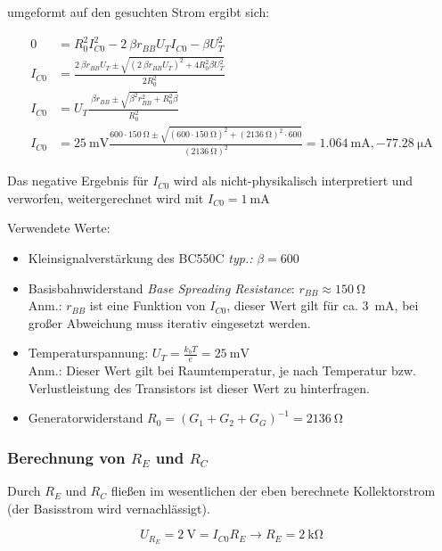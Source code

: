 umgeformt auf den gesuchten Strom ergibt sich:

\begin{align}
    0 &= R_0^2 I_{C0}^2 - 2 \ \beta  r_{BB}  U_T  I_{C0} - \beta U_{T}^2 \\
    I_{C0} &= \frac{2 \ \beta  r_{BB}  U_T \pm \sqrt{\left( 2 \ \beta  r_{BB}  U_T\right)^2 + 4  R_{0}^2 \beta U_{T}^2 }}{2 R_{0}^2} \\
    I_{C0} &= U_T \frac{ \ \beta  r_{BB} \pm \sqrt{ \beta^2  r_{BB}^2 +  R_{0}^2 \beta }}{ R_{0}^2} \\
    I_{C0} &= \SI{25}{\milli \volt} \frac{600 \cdot \SI{150}{\ohm} \pm \sqrt{(600 \cdot \SI{150}{\ohm})^2 + (\SI{2136}{\ohm})^2 \cdot 600}}{(\SI{2136}{\ohm})^2} = \SI{1.064}{\milli \ampere}, \SI{-77.28}{\micro \ampere}
\end{align}

Das negative Ergebnis für $I_{C0}$ wird als nicht-physikalisch interpretiert und verworfen, weitergerechnet wird mit $I_{C0} = \SI{1}{\milli \ampere}$

Verwendete Werte:

\begin{itemize}
    \item Kleinsignalverstärkung des BC550C \emph{typ.: }$\beta = 600$
    \item Basisbahnwiderstand \emph{Base Spreading Resistance}: $r_{BB} \approx \SI{150}{\ohm}$ \\
    Anm.: $r_{BB}$ ist eine Funktion von $I_{C0}$, dieser Wert gilt für ca. \SI{3}{\milli\ampere}, bei großer Abweichung muss iterativ eingesetzt werden.
    \item Temperaturspannung: $U_T = \frac{k_b T}{e} = \SI{25}{\milli \volt}$ \\
    Anm.: Dieser Wert gilt bei Raumtemperatur, je nach Temperatur bzw. Verlustleistung des Transistors ist dieser Wert zu hinterfragen.
    \item Generatorwiderstand $R_0 = \left( G_1 + G_2 + G_G\right)^{-1} = \SI{2136}{\ohm}$
\end{itemize}

\subsubsection{Berechnung von $R_E$ und $R_C$}

Durch $R_E$ und $R_C$ fließen im wesentlichen der eben berechnete Kollektorstrom (der Basisstrom wird vernachlässigt).

\begin{equation}
    U_{R_{E}} = \SI{2}{\volt} = I_{C0} R_E \rightarrow R_E = \SI{2}{\kilo \ohm}
\end{equation}

